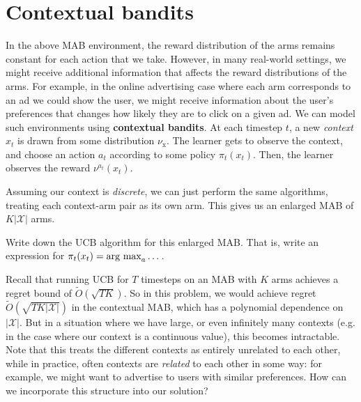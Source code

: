 \documentclass[\main/main]{subfiles}
\begin{document}
\iffalse
    \section{Gittins index}

\fi

\section{Contextual bandits}

In the above MAB environment, the reward distribution of the arms remains constant for each action that we take.
However, in many real-world settings, we might receive additional information that affects the reward distributions of the arms.
For example, in the online advertising case where each arm corresponds to an ad we could show the user,
we might receive information about the user's preferences that changes how likely they are to click on a given ad.
We can model such environments using \textbf{contextual bandits}.
At each timestep $t$, a new \emph{context} $x_t$ is drawn from some distribution $\nu_{\text{x}}$.
The learner gets to observe the context, and choose an action $a_t$ according to some policy $\pi_t(x_t)$.
Then, the learner observes the reward $\nu^{a_t}(x_t)$.

Assuming our context is \emph{discrete}, we can just perform the same algorithms, treating each context-arm pair as its own arm. This gives us an enlarged MAB of $K |\mathcal{X}|$ arms.

\begin{exercise}
    Write down the UCB algorithm for this enlarged MAB. That is, write an expression for $\pi_t(x_t) = \operatorname*{\textrm{arg\ max}}_a \dots$.
\end{exercise}

Recall that running UCB for $T$ timesteps on an MAB with $K$ arms achieves a regret bound of $\tilde{O}(\sqrt{TK})$. So in this problem, we would achieve regret $\tilde{O}(\sqrt{TK|\mathcal{X}|})$ in the contextual MAB, which has a polynomial dependence on $|\mathcal{X}|$.
But in a situation where we have large, or even infinitely many contexts (e.g. in the case where our context is a continuous value), this becomes intractable.
Note that this treats the different contexts as entirely unrelated to each other, while in practice, often contexts are \emph{related} to each other in some way: for example, we might want to advertise to users with similar preferences.
How can we incorporate this structure into our solution?
\end{document}
